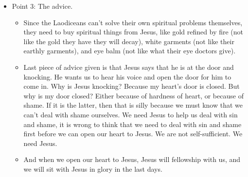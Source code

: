\begin{itemize}
{\begin{itemize}
{    could not solve this water problem themselves.  Similarly, despite the
    city’s supposed self-sufficiency, they cant solve their own spiritual problems.}
  \end{itemize}}
  \item{Point 3: The advice.
  \begin{itemize}
    \item{Since the Laodiceans can't solve their own spiritual problems
    themselves, they need to buy spiritual things from Jesus, like gold
    refined by fire (not like the gold they have they will decay), white
    garments (not like their earthly garments), and eye balm (not like what
    their eye doctors give).}
    \item{Last piece of advice given is that Jesus says that he is at the
    door and knocking.  He wants us to hear his voice and open the door for
    him to come in.  Why is Jesus knocking?  Because my heart's door is
    closed.  But why is my door closed?  Either because of hardness of heart,
    or because of shame.  If it is the latter, then that is silly because we
    must know that we can't deal with shame ourselves.  We need Jesus to help
    us deal with sin and shame, it is wrong to think that we need to deal
    with sin and shame first before we can open our heart to Jesus.  We are
    not self-sufficient.  We need Jesus.}
    \item{And when we open our heart to Jesus, Jesus will fellowship with us, and we will sit with Jesus in glory in the last days.}
  \end{itemize}
  }
\end{itemize}